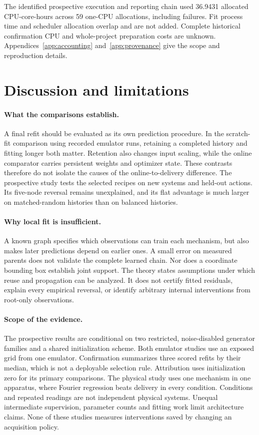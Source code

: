 The identified prospective execution and reporting chain used 36.9431 allocated
CPU-core-hours across 59 one-CPU allocations, including failures. Fit process
time and scheduler allocation overlap and are not added. Complete historical
confirmation CPU and whole-project preparation costs are unknown.
Appendices~\ref{app:accounting} and~\ref{app:provenance} give the scope and
reproduction details.

\section{Discussion and limitations}
\label{sec:discussion}
\paragraph{What the comparisons establish.}
A final refit should be evaluated as its own prediction procedure. In the
scratch-fit comparison using recorded emulator runs, retaining a completed history and fitting longer
both matter. Retention also changes input scaling, while the online comparator
carries persistent weights and optimizer state. These contrasts therefore do
not isolate the causes of the online-to-delivery difference. The prospective
study tests the selected recipes on new systems and held-out actions. Its
five-node reversal remains unexplained, and its flat advantage is much larger
on matched-random histories than on balanced histories.

\paragraph{Why local fit is insufficient.}
A known graph specifies which observations can train each mechanism, but also
makes later predictions depend on earlier ones. A small error on measured
parents does not validate the complete learned chain. Nor does a coordinate
bounding box establish joint support. The theory states assumptions under
which reuse and propagation can be analyzed. It does not certify fitted
residuals, explain every empirical reversal, or identify arbitrary internal
interventions from root-only observations.

\paragraph{Scope of the evidence.}
The prospective results are conditional on two restricted, noise-disabled
generator families and a shared initialization scheme. Both emulator studies
use an exposed grid from one emulator. Confirmation summarizes three scored
refits by their median, which is not a deployable selection rule. Attribution
uses initialization zero for its primary comparisons. The physical study
uses one mechanism in one apparatus, where Fourier regression beats delivery
in every condition. Conditions and repeated readings are not independent
physical systems. Unequal intermediate supervision, parameter counts and
fitting work limit architecture claims. None of these studies measures
interventions saved by changing an acquisition policy.

